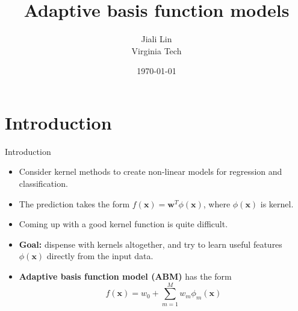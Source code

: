 \documentclass[10pt,mathserif]{beamer}
\title{\large \bfseries Adaptive basis function models}
\author{Jiali Lin\\[3ex]
Virginia Tech}
\date{\today}
\begin{document}
\frame{
\thispagestyle{empty}
\titlepage
}

\section{Introduction}
\begin{frame}{Introduction}
\begin{itemize}
    \item Consider kernel methods to create non-linear models for regression and classification.
    \item The prediction takes the form $f(\bm{x}) = \bm{w}^T \phi(\bm{x})$,
    where $\phi(\bm{x})$ is kernel.
    \item Coming up with a good kernel function is quite difficult.
    \item \textbf{Goal:} dispense with kernels altogether, and try to learn useful features $\phi(\bm{x})$ directly from the input data.
    \item \textbf{Adaptive basis function model (ABM)} has the form
    \begin{equation*}
        f(\bm{x}) = w_0 + \sum_{m=1}^M w_m\phi_m(\bm{x})
    \end{equation*}
\end{itemize}
\end{frame}
\end{document}
